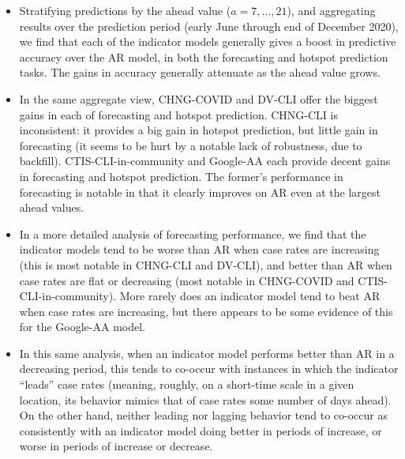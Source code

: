 \documentclass[9pt,twocolumn,twoside,lineno]{pnas-new}
\begin{document}
\begin{itemize}
\item Stratifying predictions by the ahead value ($a=7,\ldots,21$), and
  aggregating results over the prediction period (early June through end of
  December 2020), we find that each of the indicator models generally gives a
  boost in predictive accuracy over the AR model, in both the forecasting and
  hotspot prediction tasks.  The gains in accuracy generally attenuate as the
  ahead value grows. 

\item In the same aggregate view, CHNG-COVID and DV-CLI offer the biggest 
  gains in each of forecasting and hotspot prediction.  CHNG-CLI is
  inconsistent: it provides a big gain in hotspot prediction, but little gain 
  in forecasting (it seems to be hurt by a notable lack of robustness, due
  to backfill).  CTIS-CLI-in-community and Google-AA each provide decent 
  gains in forecasting and hotspot prediction.  The former's performance in 
  forecasting is notable in that it clearly improves on AR even at the largest
  ahead values.   

\item In a more detailed analysis of forecasting performance, we find that the
  indicator models tend to be worse than AR when case rates are increasing (this
  is most notable in CHNG-CLI and DV-CLI), and better than AR when case rates
  are flat or decreasing (most notable in CHNG-COVID and CTIS-CLI-in-community).
  More rarely does an indicator model tend to beat AR when case rates are 
  increasing, but there appears to be some evidence of this for the Google-AA
  model. 

\item In this same analysis, when an indicator model performs better than AR in
  a decreasing period, this tends to co-occur with instances in which the
  indicator ``leads'' case rates (meaning, roughly, on a short-time scale in a
  given location, its behavior mimics that of case rates some number of days
  ahead).  On the other hand, neither leading nor lagging behavior tend to
  co-occur as consistently with an indicator model doing better in periods of
  increase, or worse in periods of increase or decrease.   
\end{itemize}
\end{document}
